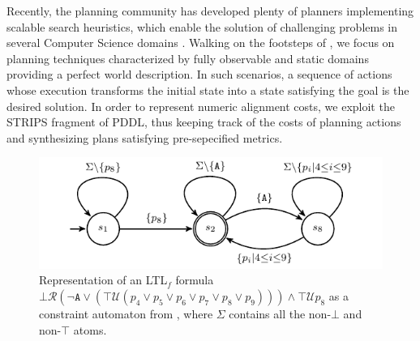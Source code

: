 Recently, the planning community has developed plenty of planners implementing scalable search heuristics, which enable the solution of challenging problems in several Computer Science domains \cite{Marrella17}. Walking on the footsteps of \cite{MaggiMCA18}, we focus on planning techniques characterized by fully observable and static domains providing a perfect world description. In such scenarios, a sequence of actions whose execution transforms the initial state into a state satisfying the goal is the desired solution. In order to represent numeric alignment costs, we exploit the STRIPS fragment of PDDL, thus keeping track of the costs of planning actions and synthesizing plans satisfying pre-sepecified metrics.

\begin{figure}[!t]
	\centering
%
\includegraphics[scale=0.9]{images/example_3_graph}
	\caption{Representation of an LTL$_f$ formula $\bot\mathcal{R}(\neg\texttt{A}\vee(\top\mathcal{U}(p_4\vee p_5\vee p_6\vee p_7\vee p_8\vee p_9)))\wedge\top\mathcal{U} p_8$  as a constraint automaton from \cite{LeoniMA12,Westergaard11}, where $\Sigma$ contains all the non-$\bot$ and non-$\top$ atoms.}
	\label{fig:g1g2}
\end{figure}

